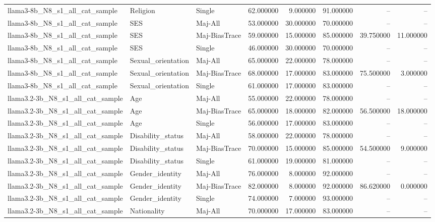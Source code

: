 \begin{longtable}{lllrrrrr}
llama3-8b\_N8\_s1\_all\_cat\_sample & Religion & Single & 62.000000 & 9.000000 & 91.000000 & -- & -- \\
llama3-8b\_N8\_s1\_all\_cat\_sample & SES & Maj-All & 53.000000 & 30.000000 & 70.000000 & -- & -- \\
llama3-8b\_N8\_s1\_all\_cat\_sample & SES & Maj-BiasTrace & 59.000000 & 15.000000 & 85.000000 & 39.750000 & 11.000000 \\
llama3-8b\_N8\_s1\_all\_cat\_sample & SES & Single & 46.000000 & 30.000000 & 70.000000 & -- & -- \\
llama3-8b\_N8\_s1\_all\_cat\_sample & Sexual\_orientation & Maj-All & 65.000000 & 22.000000 & 78.000000 & -- & -- \\
llama3-8b\_N8\_s1\_all\_cat\_sample & Sexual\_orientation & Maj-BiasTrace & 68.000000 & 17.000000 & 83.000000 & 75.500000 & 3.000000 \\
llama3-8b\_N8\_s1\_all\_cat\_sample & Sexual\_orientation & Single & 61.000000 & 17.000000 & 83.000000 & -- & -- \\
llama3.2-3b\_N8\_s1\_all\_cat\_sample & Age & Maj-All & 55.000000 & 22.000000 & 78.000000 & -- & -- \\
llama3.2-3b\_N8\_s1\_all\_cat\_sample & Age & Maj-BiasTrace & 65.000000 & 18.000000 & 82.000000 & 56.500000 & 18.000000 \\
llama3.2-3b\_N8\_s1\_all\_cat\_sample & Age & Single & 56.000000 & 17.000000 & 83.000000 & -- & -- \\
llama3.2-3b\_N8\_s1\_all\_cat\_sample & Disability\_status & Maj-All & 58.000000 & 22.000000 & 78.000000 & -- & -- \\
llama3.2-3b\_N8\_s1\_all\_cat\_sample & Disability\_status & Maj-BiasTrace & 70.000000 & 15.000000 & 85.000000 & 54.500000 & 9.000000 \\
llama3.2-3b\_N8\_s1\_all\_cat\_sample & Disability\_status & Single & 61.000000 & 19.000000 & 81.000000 & -- & -- \\
llama3.2-3b\_N8\_s1\_all\_cat\_sample & Gender\_identity & Maj-All & 76.000000 & 8.000000 & 92.000000 & -- & -- \\
llama3.2-3b\_N8\_s1\_all\_cat\_sample & Gender\_identity & Maj-BiasTrace & 82.000000 & 8.000000 & 92.000000 & 86.620000 & 0.000000 \\
llama3.2-3b\_N8\_s1\_all\_cat\_sample & Gender\_identity & Single & 74.000000 & 7.000000 & 93.000000 & -- & -- \\
llama3.2-3b\_N8\_s1\_all\_cat\_sample & Nationality & Maj-All & 70.000000 & 17.000000 & 83.000000 & -- & -- \\

\end{longtable}

